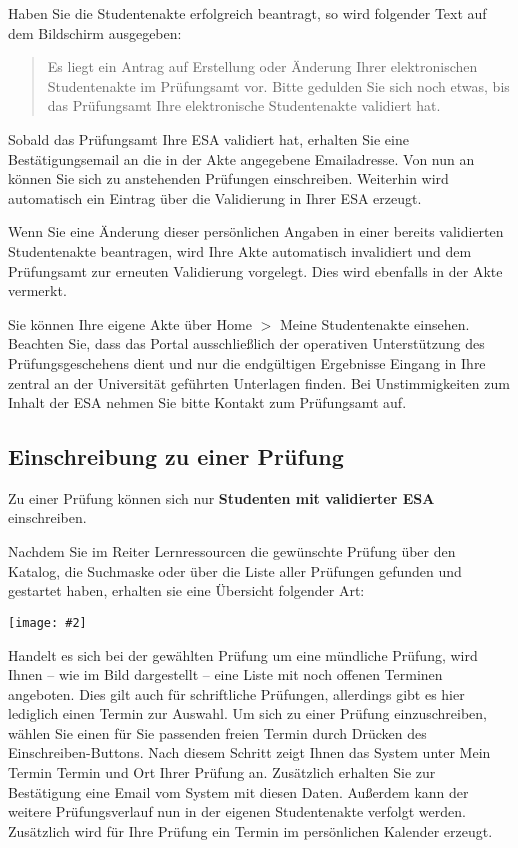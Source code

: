\documentclass[a4paper,11pt]{article}
\newcommand{\bild}[2]{
    \begin{center}\texttt{[image: \#2]}\end{center}
}
\newcommand{\knopf}[1]{{\sc #1}}
\begin{document}
Haben Sie die Studentenakte erfolgreich beantragt, so wird folgender Text auf
dem Bildschirm ausgegeben:
\begin{quote}
  Es liegt ein Antrag auf Erstellung oder Änderung Ihrer elektronischen
  Studentenakte im Prüfungsamt vor. Bitte gedulden Sie sich noch etwas, bis
  das Prüfungsamt Ihre elektronische Studentenakte validiert hat.
\end{quote}
Sobald das Prüfungsamt Ihre ESA validiert hat, erhalten Sie eine
Bestätigungsemail an die in der Akte angegebene Emailadresse.  Von nun an
können Sie sich zu anstehenden Prüfungen einschreiben. Weiterhin wird
automatisch ein Eintrag über die Validierung in Ihrer ESA erzeugt.

Wenn Sie eine Änderung dieser persönlichen Angaben in einer bereits
validierten Studentenakte beantragen, wird Ihre Akte automatisch invalidiert
und dem Prüfungsamt zur erneuten Validierung vorgelegt. Dies wird ebenfalls in
der Akte vermerkt.

Sie können Ihre eigene Akte über \knopf{Home $>$ Meine Studentenakte}
einsehen.  Beachten Sie, dass das Portal ausschließlich der operativen
Unterstützung des Prüfungsgeschehens dient und nur die endgültigen Ergebnisse
Eingang in Ihre zentral an der Universität geführten Unterlagen finden. Bei
Unstimmigkeiten zum Inhalt der ESA nehmen Sie bitte Kontakt zum Prüfungsamt
auf.

\subsection{Einschreibung zu einer Prüfung}

Zu einer Prüfung können sich nur {\bf Studenten mit validierter ESA}
einschreiben.

Nachdem Sie im Reiter \knopf{Lernressourcen} die gewünschte Prüfung über den
Katalog, die Suchmaske oder über die Liste aller Prüfungen gefunden und
gestartet haben, erhalten sie eine Übersicht folgender Art:

\bild{.9}{Pruefung-Einschreiben}

Handelt es sich bei der gewählten Prüfung um eine mündliche Prüfung, wird
Ihnen -- wie im Bild dargestellt -- eine Liste mit noch offenen Terminen
angeboten.  Dies gilt auch für schriftliche Prüfungen, allerdings gibt es hier
lediglich einen Termin zur Auswahl. Um sich zu einer Prüfung einzuschreiben,
wählen Sie einen für Sie passenden freien Termin durch Drücken des
\knopf{Einschreiben}-Buttons. Nach diesem Schritt zeigt Ihnen das System unter
\knopf{Mein Termin} Termin und Ort Ihrer Prüfung an. Zusätzlich erhalten Sie
zur Bestätigung eine Email vom System mit diesen Daten. Außerdem kann der
weitere Prüfungsverlauf nun in der eigenen Studentenakte verfolgt werden.
Zusätzlich wird für Ihre Prüfung ein Termin im persönlichen Kalender erzeugt.
 
\end{document}
